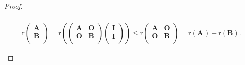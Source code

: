 \documentclass[lang=cn,newtx,10pt,scheme=chinese]{elegantbook}
\begin{document}
\begin{proof}
\begin{enumerate}[(1)]
\begin{align*}
\\
\mathrm{r}\left( \begin{array}{c}
\boldsymbol{A}\\
\boldsymbol{B}\\
\end{array} \right) =\mathrm{r}\left( \left( \begin{matrix}
\boldsymbol{A}&		\boldsymbol{O}\\
\boldsymbol{O}&		\boldsymbol{B}\\
\end{matrix} \right) \left( \begin{array}{c}
\boldsymbol{I}\\
\boldsymbol{I}\\
\end{array} \right) \right) \leqslant \mathrm{r}\left( \begin{matrix}
\boldsymbol{A}&		\boldsymbol{O}\\
\boldsymbol{O}&		\boldsymbol{B}\\
\end{matrix} \right) =\mathrm{r}\left( \boldsymbol{A} \right) +\mathrm{r}\left( \boldsymbol{B} \right) .
\end{align*}


\end{enumerate}
\end{proof}
\end{document}

